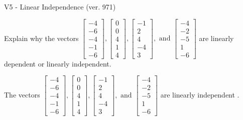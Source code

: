 \begin{exercise}
  \begin{exerciseTitle}V5 - Linear Independence (ver. 971)\end{exerciseTitle}
  \begin{exerciseStatement}
    Explain why the vectors \(\left[\begin{array}{r}
-4 \\
-6 \\
-4 \\
-1 \\
-6
\end{array}\right] , \left[\begin{array}{r}
0 \\
0 \\
4 \\
1 \\
4
\end{array}\right] , \left[\begin{array}{r}
-1 \\
2 \\
4 \\
-4 \\
3
\end{array}\right] , \text{ and } \left[\begin{array}{r}
-4 \\
-2 \\
-5 \\
1 \\
-6
\end{array}\right]\) are linearly dependent or linearly independent.	


  \end{exerciseStatement}
  \begin{exerciseAnswer}
   The vectors \(\left[\begin{array}{r}
-4 \\
-6 \\
-4 \\
-1 \\
-6
\end{array}\right] , \left[\begin{array}{r}
0 \\
0 \\
4 \\
1 \\
4
\end{array}\right] , \left[\begin{array}{r}
-1 \\
2 \\
4 \\
-4 \\
3
\end{array}\right] , \text{ and } \left[\begin{array}{r}
-4 \\
-2 \\
-5 \\
1 \\
-6
\end{array}\right]\) are 
  	 linearly independent  .
  


  \end{exerciseAnswer}
\end{exercise}